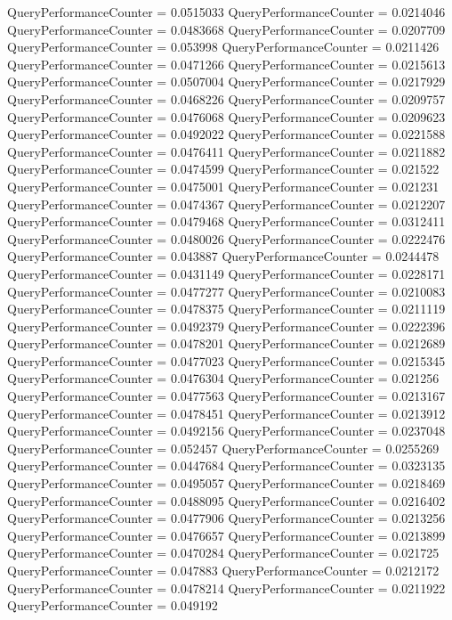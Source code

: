 \documentclass[9pt]{article}
\theoremstyle{plain}
\theoremstyle{definition}
\theoremstyle{remark}
\numberwithin{equation}{section}
\begin{document}
QueryPerformanceCounter  =  0.0515033
QueryPerformanceCounter  =  0.0214046
QueryPerformanceCounter  =  0.0483668
QueryPerformanceCounter  =  0.0207709
QueryPerformanceCounter  =  0.053998
QueryPerformanceCounter  =  0.0211426
QueryPerformanceCounter  =  0.0471266
QueryPerformanceCounter  =  0.0215613
QueryPerformanceCounter  =  0.0507004
QueryPerformanceCounter  =  0.0217929
QueryPerformanceCounter  =  0.0468226
QueryPerformanceCounter  =  0.0209757
QueryPerformanceCounter  =  0.0476068
QueryPerformanceCounter  =  0.0209623
QueryPerformanceCounter  =  0.0492022
QueryPerformanceCounter  =  0.0221588
QueryPerformanceCounter  =  0.0476411
QueryPerformanceCounter  =  0.0211882
QueryPerformanceCounter  =  0.0474599
QueryPerformanceCounter  =  0.021522
QueryPerformanceCounter  =  0.0475001
QueryPerformanceCounter  =  0.021231
QueryPerformanceCounter  =  0.0474367
QueryPerformanceCounter  =  0.0212207
QueryPerformanceCounter  =  0.0479468
QueryPerformanceCounter  =  0.0312411
QueryPerformanceCounter  =  0.0480026
QueryPerformanceCounter  =  0.0222476
QueryPerformanceCounter  =  0.043887
QueryPerformanceCounter  =  0.0244478
QueryPerformanceCounter  =  0.0431149
QueryPerformanceCounter  =  0.0228171
QueryPerformanceCounter  =  0.0477277
QueryPerformanceCounter  =  0.0210083
QueryPerformanceCounter  =  0.0478375
QueryPerformanceCounter  =  0.0211119
QueryPerformanceCounter  =  0.0492379
QueryPerformanceCounter  =  0.0222396
QueryPerformanceCounter  =  0.0478201
QueryPerformanceCounter  =  0.0212689
QueryPerformanceCounter  =  0.0477023
QueryPerformanceCounter  =  0.0215345
QueryPerformanceCounter  =  0.0476304
QueryPerformanceCounter  =  0.021256
QueryPerformanceCounter  =  0.0477563
QueryPerformanceCounter  =  0.0213167
QueryPerformanceCounter  =  0.0478451
QueryPerformanceCounter  =  0.0213912
QueryPerformanceCounter  =  0.0492156
QueryPerformanceCounter  =  0.0237048
QueryPerformanceCounter  =  0.052457
QueryPerformanceCounter  =  0.0255269
QueryPerformanceCounter  =  0.0447684
QueryPerformanceCounter  =  0.0323135
QueryPerformanceCounter  =  0.0495057
QueryPerformanceCounter  =  0.0218469
QueryPerformanceCounter  =  0.0488095
QueryPerformanceCounter  =  0.0216402
QueryPerformanceCounter  =  0.0477906
QueryPerformanceCounter  =  0.0213256
QueryPerformanceCounter  =  0.0476657
QueryPerformanceCounter  =  0.0213899
QueryPerformanceCounter  =  0.0470284
QueryPerformanceCounter  =  0.021725
QueryPerformanceCounter  =  0.047883
QueryPerformanceCounter  =  0.0212172
QueryPerformanceCounter  =  0.0478214
QueryPerformanceCounter  =  0.0211922
QueryPerformanceCounter  =  0.049192
\end{document}
